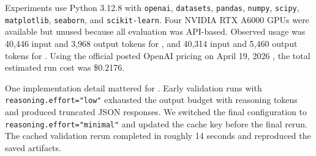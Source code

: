  Experiments use Python 3.12.8 with \texttt{openai}, \texttt{datasets}, \texttt{pandas}, \texttt{numpy}, \texttt{scipy}, \texttt{matplotlib}, \texttt{seaborn}, and \texttt{scikit-learn}. Four NVIDIA RTX A6000 GPUs were available but unused because all evaluation was API-based. Observed usage was 40,446 input and 3,968 output tokens for \gptfourone, and 40,314 input and 5,460 output tokens for \gptfive. Using the official posted OpenAI pricing on April 19, 2026 \cite{openai_pricing}, the total estimated run cost was \$0.2176.

 One implementation detail mattered for \gptfive. Early validation runs with \texttt{reasoning.effort="low"} exhausted the output budget with reasoning tokens and produced truncated JSON responses. We switched the final configuration to \texttt{reasoning.effort="minimal"} and updated the cache key before the final rerun. The cached validation rerun completed in roughly 14 seconds and reproduced the saved artifacts.
